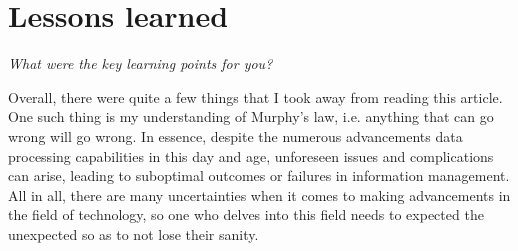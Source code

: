\documentclass[12pt]{article}
\begin{document}
\section*{Lessons learned}

\textit{What were the key learning points for you?}

Overall, there were quite a few things that I took away from reading this article. One such thing is my understanding of Murphy's law, i.e. anything that can go wrong will go wrong. In essence, despite the numerous advancements data processing capabilities in this day and age, unforeseen issues and complications can arise, leading to suboptimal outcomes or failures in information management. All in all, there are many uncertainties when it comes to making advancements in the field of technology, so one who delves into this field needs to expected the unexpected so as to not lose their sanity.
\end{document}
